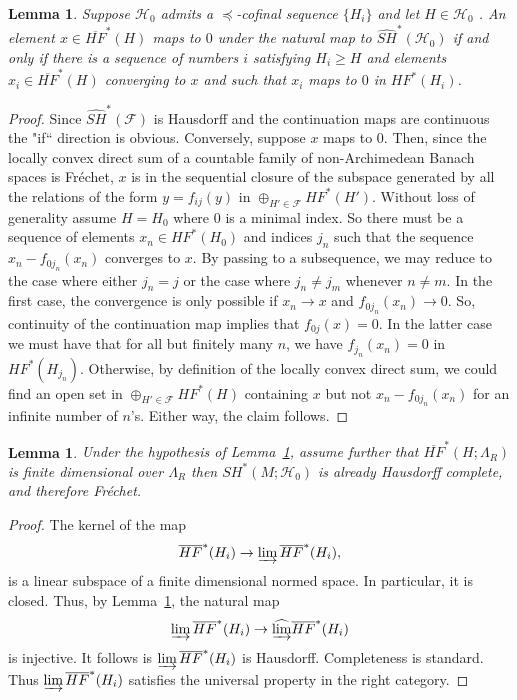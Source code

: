 \documentclass[11pt]{amsart}
\newtheorem{lm}[tm]{Lemma}
\theoremstyle{definition}
\theoremstyle{remark}
\begin{document}
\begin{lm}\label{lmCharVanHaus}
Suppose $\mathcal{H}_0$ admits a $\preceq$-cofinal sequence $\{H_i\}$ and let $H\in\mathcal{H}_0$ . An element $x\in \overline{HF}^*(H)$ maps to $0$ under  the natural map to $\widehat{SH}^*(\mathcal{H}_0)$ if and only if there is a sequence of numbers $i$ satisfying $H_i\geq H$ and elements $x_i\in  \overline{HF}^*(H)$ converging to $x$ and such that $x_i$ maps to $0$ in $HF^*(H_i)$.
\end{lm}
\begin{proof}
Since $\widehat{SH}^*(\mathcal{F})$  is Hausdorff and the continuation maps are continuous the "if`` direction is obvious. Conversely, suppose $x$ maps to $0$. Then, since the locally convex direct sum of a countable family of non-Archimedean Banach spaces is Fr\'echet, $x$ is in the sequential closure of the subspace generated by all the relations  of the form $y=f_{ij}(y)$ in $\oplus_{H'\in\mathcal{F}}HF^*(H')$. Without loss of generality assume $H=H_0$ where $0$ is a minimal index. So there must be a sequence of elements $x_n\in HF^*(H_0)$ and indices $j_n$ such that  the sequence $x_n-f_{0j_n}(x_n)$ converges to $x$. By passing to a subsequence, we may reduce to the case where either $j_n=j$ or the case where $j_n\neq  j_m$  whenever $n\neq m$. In the first case, the convergence is only possible if $x_n\to x$ and $f_{0j_n}(x_n)\to 0$. So, continuity of the continuation map implies that $f_{0j}(x)=0$. In the latter case we must have that for all but finitely many $n$, we have $f_{j_n}(x_n)=0$ in $HF^*(H_{j_n})$. Otherwise, by definition of the locally convex direct sum, we could find an open set in $\oplus_{H'\in\mathcal{F}}HF^*(H)$ containing $x$ but not $x_n-f_{0j_n}(x_n)$ for an infinite number of $n$'s. Either way, the claim follows.
\end{proof}

\begin{lm}\label{lmFinDimLim}
Under the hypothesis of Lemma~\ref{lmCharVanHaus}, assume further that $\overline{HF}^*(H;\Lambda_R)$ is finite dimensional over $\Lambda_R$ then $SH^*(M;\mathcal{H}_0)$ is already Hausdorff complete, and therefore Fr\'echet.
\end{lm}
\begin{proof}
The kernel of the map
\[
\overline{HF}^*(H_i)\to\varinjlim\overline{HF}^*(H_i),
\]
is a linear subspace of a finite dimensional normed space. In particular, it is closed. Thus, by Lemma~\ref{lmCharVanHaus}, the natural map
\[
\varinjlim\overline{HF}^*(H_i)\to\widehat{\varinjlim}\overline{HF}^*(H_i)
\]
is injective. It follows is $\varinjlim\overline{HF}^*(H_i)$ is Hausdorff. Completeness is standard. Thus $\varinjlim\overline{HF}^*(H_i)$ satisfies the universal property in the right category.
\end{proof}
\end{document}
